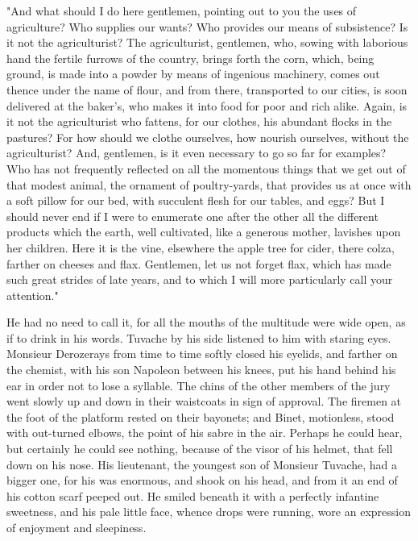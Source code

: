 \documentclass[11pt,twocolumn]{ltugboat}
\begin{document}
"And what should I do here gentlemen, pointing out to you the uses
of agriculture? Who supplies our wants? Who provides our means of
subsistence? Is it not the agriculturist? The agriculturist, gentlemen,
who, sowing with laborious hand the fertile furrows of the country,
brings forth the corn, which, being ground, is made into a powder by
means of ingenious machinery, comes out thence under the name of flour,
and from there, transported to our cities, is soon delivered at the
baker's, who makes it into food for poor and rich alike. Again, is it
not the agriculturist who fattens, for our clothes, his abundant
flocks in the pastures? For how should we clothe ourselves, how nourish
ourselves, without the agriculturist? And, gentlemen, is it even
necessary to go so far for examples? Who has not frequently reflected
on all the momentous things that we get out of that modest animal, the
ornament of poultry-yards, that provides us at once with a soft pillow
for our bed, with succulent flesh for our tables, and eggs? But I should
never end if I were to enumerate one after the other all the different
products which the earth, well cultivated, like a generous mother,
lavishes upon her children. Here it is the vine, elsewhere the apple
tree for cider, there colza, farther on cheeses and flax. Gentlemen, let
us not forget flax, which has made such great strides of late years, and
to which I will more particularly call your attention."

He had no need to call it, for all the mouths of the multitude were wide
open, as if to drink in his words. Tuvache by his side listened to him
with staring eyes. Monsieur Derozerays from time to time softly closed
his eyelids, and farther on the chemist, with his son Napoleon between
his knees, put his hand behind his ear in order not to lose a syllable.
The chins of the other members of the jury went slowly up and down in
their waistcoats in sign of approval. The firemen at the foot of the
platform rested on their bayonets; and Binet, motionless, stood with
out-turned elbows, the point of his sabre in the air. Perhaps he could
hear, but certainly he could see nothing, because of the visor of his
helmet, that fell down on his nose. His lieutenant, the youngest son of
Monsieur Tuvache, had a bigger one, for his was enormous, and shook on
his head, and from it an end of his cotton scarf peeped out. He smiled
beneath it with a perfectly infantine sweetness, and his pale little
face, whence drops were running, wore an expression of enjoyment and
sleepiness.
\end{document}

